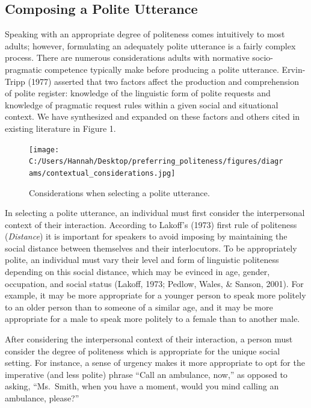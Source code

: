 \documentclass[
  english,
  man,floatsintext]{apa6}
\begin{document}
\hypertarget{composing-a-polite-utterance}{%
\subsection{Composing a Polite Utterance}\label{composing-a-polite-utterance}}

Speaking with an appropriate degree of politeness comes intuitively to most adults; however, formulating an adequately polite utterance is a fairly complex process. There are numerous considerations adults with normative socio-pragmatic competence typically make before producing a polite utterance. Ervin-Tripp (1977) asserted that two factors affect the production and comprehension of polite register: knowledge of the linguistic form of polite requests and knowledge of pragmatic request rules within a given social and situational context. We have synthesized and expanded on these factors and others cited in existing literature in Figure 1.

\begin{figure}
\centering
\texttt{[image: C:/Users/Hannah/Desktop/preferring\_politeness/figures/diagrams/contextual\_considerations.jpg]}
\caption{Considerations when selecting a polite utterance.}
\end{figure}

\newpage

In selecting a polite utterance, an individual must first consider the interpersonal context of their interaction. According to Lakoff's (1973) first rule of politeness (\emph{Distance}) it is important for speakers to avoid imposing by maintaining the social distance between themselves and their interlocutors. To be appropriately polite, an individual must vary their level and form of linguistic politeness depending on this social distance, which may be evinced in age, gender, occupation, and social status (Lakoff, 1973; Pedlow, Wales, \& Sanson, 2001). For example, it may be more appropriate for a younger person to speak more politely to an older person than to someone of a similar age, and it may be more appropriate for a male to speak more politely to a female than to another male.

After considering the interpersonal context of their interaction, a person must consider the degree of politeness which is appropriate for the unique social setting. For instance, a sense of urgency makes it more appropriate to opt for the imperative (and less polite) phrase ``Call an ambulance, now,'' as opposed to asking, ``Ms.~Smith, when you have a moment, would you mind calling an ambulance, please?''
\end{document}
